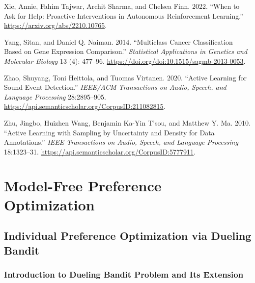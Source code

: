 \documentclass[
  letterpaper,
  numbers=noenddot,
  DIV=11,
  oneside]{scrreprt}
\newlength{\cslhangindent}
\newenvironment{CSLReferences}[2] %
 {\begin{list}{}{%
  \setlength{\itemindent}{0pt}
  \setlength{\leftmargin}{0pt}
  \setlength{\parsep}{0pt}
  \ifodd #1
   \setlength{\leftmargin}{\cslhangindent}
   \setlength{\itemindent}{-1\cslhangindent}
  \fi
  \setlength{\itemsep}{#2\baselineskip}}}
 {\end{list}}
\let\oldchapter\chapter
\def\chapter{%
  \setcounter{sidenote}{1}%
  \oldchapter
}
\theoremstyle{remark}
\begin{document}
\begin{CSLReferences}{1}{0}
Xie, Annie, Fahim Tajwar, Archit Sharma, and Chelsea Finn. 2022. {``When
to Ask for Help: Proactive Interventions in Autonomous Reinforcement
Learning.''} \url{https://arxiv.org/abs/2210.10765}.

Yang, Sitan, and Daniel Q. Naiman. 2014. {``Multiclass Cancer
Classification Based on Gene Expression Comparison.''} \emph{Statistical
Applications in Genetics and Molecular Biology} 13 (4): 477--96.
\url{https://doi.org/doi:10.1515/sagmb-2013-0053}.

Zhao, Shuyang, Toni Heittola, and Tuomas Virtanen. 2020. {``Active
Learning for Sound Event Detection.''} \emph{IEEE/ACM Transactions on
Audio, Speech, and Language Processing} 28:2895--905.
\url{https://api.semanticscholar.org/CorpusID:211082815}.

Zhu, Jingbo, Huizhen Wang, Benjamin Ka-Yin T'sou, and Matthew Y. Ma.
2010. {``Active Learning with Sampling by Uncertainty and Density for
Data Annotations.''} \emph{IEEE Transactions on Audio, Speech, and
Language Processing} 18:1323--31.
\url{https://api.semanticscholar.org/CorpusID:5777911}.

\end{CSLReferences}


\chapter{Model-Free Preference Optimization}\label{sec-model-free}

\section{Individual Preference Optimization via Dueling
Bandit}\label{individual-preference-optimization-via-dueling-bandit}

\subsection{Introduction to Dueling Bandit Problem and Its
Extension}\label{introduction-to-dueling-bandit-problem-and-its-extension}
\end{document}
